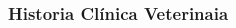 \documentclass[14pt]{beamer}
\begin{document}
\begin{frame}
\frametitle{Historia Clínica Veterinaia}

\begin{columns}
\begin{column}{0.5\textwidth}
\begin{center}


\end{center}
\end{column}
\begin{column}{0.5\textwidth}
\begin{center}


\end{center}
\end{column}
\end{columns}
\end{frame}
\end{document}
